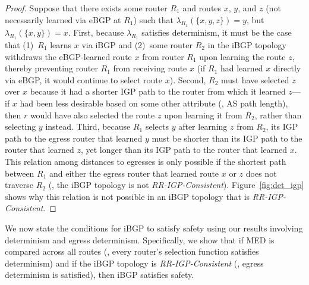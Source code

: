 \begin{proof}
Suppose that there exists some router $R_1$ and routes $x$, $y$, and $z$
(not necessarily learned via eBGP at $R_1$) such that
$\lambda_{R_1}(\{x,y,z\}) = y$, but $\lambda_{R_1}(\{x,y\}) = x$.  
%
First, because $\lambda_{R_1}$ satisfies determinism, it must be the case
that (1)~$R_1$ learns $x$ via iBGP and (2)~some router $R_2$ in the iBGP
topology withdraws the eBGP-learned 
route $x$ from router $R_1$ upon learning the route $z$, thereby
preventing router $R_1$ from receiving route $x$ (if $R_1$ had learned
$x$ directly via eBGP, it would continue to select route $x$).
%
Second, $R_2$ must have selected $z$ over $x$ because it had a shorter
IGP path to the router from which it learned $z$---if $x$ had been less
desirable based on some other attribute (\eg, AS path length), then $r$
would have also selected the route $z$ upon learning it from $R_2$,
rather than selecting $y$ instead.
%
Third, because $R_1$ selects $y$ after learning $z$ from $R_2$, its IGP
path to the egress router that learned $y$ must be shorter than its IGP
path to the router that learned $z$, yet longer than its IGP path to the
router that learned $x$.   
%
This relation among distances to egresses is only possible if the
shortest path between $R_1$ and either the egress router that learned
route $x$ or $z$ does not traverse $R_2$ (\ie, the iBGP topology is not
{\em RR-IGP-Consistent}).  Figure~\ref{fig:det_igp} shows why this
relation is not possible in an iBGP topology that is {\em
RR-IGP-Consistent}.
\end{proof}

We now state the conditions for iBGP to satisfy safety using our results
involving determinism and egress determinism.  Specifically, we show
that if MED is compared across all routes (\ie, every router's selection
function satisfies determinism) and if the iBGP topology is {\em
RR-IGP-Consistent} (\ie, egress determinism is satisfied), then iBGP
satisfies safety.

